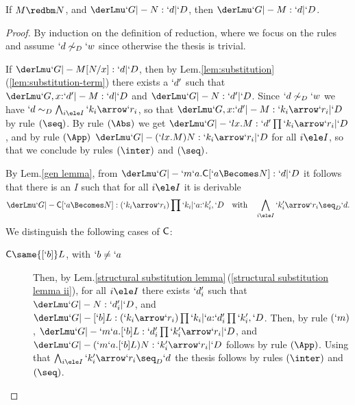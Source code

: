 \documentclass{lmcs}
\begin{document}
 \begin{thm} \label{Subject expansion} 
If $M \redbm N$, and $ \derLmu `G |- N : `d | `D $, then $ \derLmu `G |- M : `d | `D $.
 \end{thm}
 \begin{proof} %
By induction on the definition of reduction, 
where we focus on the rules and assume $`d \not\sim_D `w$ since otherwise the thesis is trivial.

 \begin{description} \itemsep 2pt

 \item [{$ (`l x . M ) N \red M [ N /x ] $}]
If $ \derLmu `G |- M[N/x] : `d | `D $, then by Lem.\skp\ref{lem:substitution}\skp(\ref{lem:substitution-term}) there exists a $`d'$ such that 
$ \derLmu `G,x{:}`d' |- M : `d | `D $ and $ \derLmu `G |- N : `d' | `D $. Since $`d \not\sim_D `w$ 
we have $`d \sim_D \bigwedge_{i\ele I} `k_i\arrow `r_i$, so that
$ \derLmu `G,x{:}`d' |- M : `k_i\arrow `r_i | `D $ by rule $(\seq)$. By rule $(\Abs)$ we get
$ \derLmu `G |- `l x.M : `d'\prod `k_i\arrow `r_i | `D $, and by rule $(\App)$ 
$ \derLmu `G |- (`l x.M)N : `k_i\arrow `r_i | `D $ for all $i\ele I$, so that we conclude by rules $(\inter)$ and $(\seq)$.



 \item [{$ (`m `a . {\Cmd} ) N \red `m `a . {\Cmd} [ `a \Becomes N ] $}]
By Lem.\skp\ref{gen lemma}, from $\derLmu `G |- {`m `a . \Cmd[ `a \Becomes N ]} : `d | `D $ it follows that there is an $I$ 
such that for all $i\ele I$ it is derivable
 \[\derLmu `G |- {{\Cmd}[ `a \Becomes N ]} : (`k_i\arrow `r_i)\prod `k_i | `a{:}`k'_i ,`D \quad \text{with} \quad
 \bigwedge_{i\ele I} `k'_i\arrow `r_i \seq_D `d.\]
We distinguish the following cases of $\textrm{\sf C}$:

 \begin{description}

 \item [$ \Cmd \same {[`b]}L$, with $`b \neq `a $] 
Then, by Lem.\skp\ref{structural substitution lemma}\,(\ref{structural substitution lemma ii}), for all $i\ele I$
there exists $`d'_i$ such that 
$\derLmu `G |- N : `d'_i | `D $, and $ \derLmu `G |- {{[`b]}L} : (`k_i\arrow `r_i)\prod `k_i | `a{:}`d'_i\prod `k'_i,`D $.
Then, by rule $(`m)$, $ \derLmu `G |- `m`a.{{[`b]}L} : `d'_i\prod `k'_i\arrow `r_i | `D $, and 
$ \derLmu `G |- (`m`a.{{[`b]}L})N : `k'_i\arrow `r_i | `D $ follows by rule $(\App)$. Using that 
$ \bigwedge_{i\ele I} `k'_i\arrow `r_i \seq_D `d$ the thesis follows by rules $(\inter)$ and $(\seq)$.




\end{description}
\end{description}
\end{proof}
\end{document}

